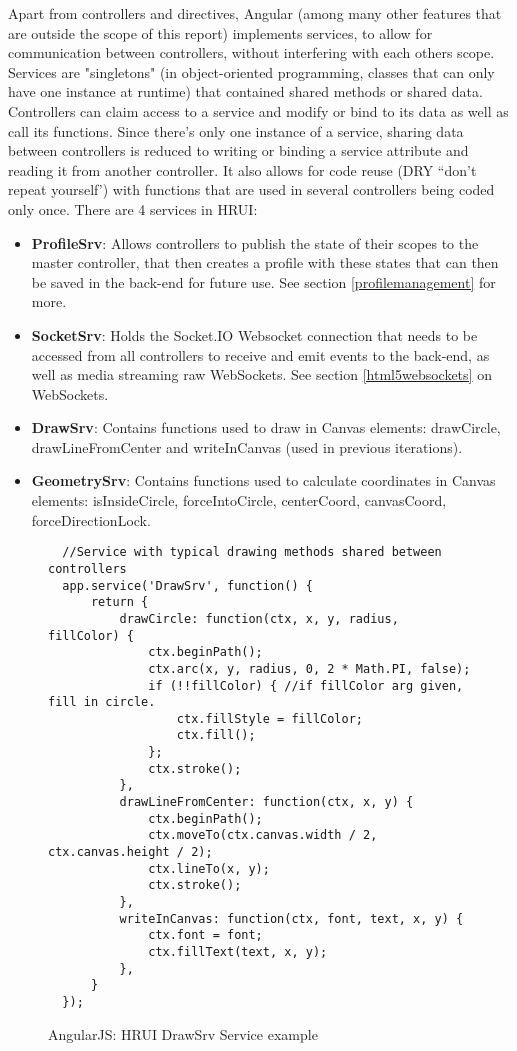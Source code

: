 Apart from controllers and directives, Angular (among many other features that are outside the scope of this report) implements services, to allow for communication between controllers, without interfering with each others scope. Services are "singletons" (in object-oriented programming, classes that can only have one instance at runtime) that contained shared methods or shared data. Controllers can claim access to a service and modify or bind to its data as well as call its functions. Since there's only one instance of a service, sharing data between controllers is reduced to writing or binding a service attribute and reading it from another controller. It also allows for code reuse (DRY ``don't repeat yourself') with functions that are used in several controllers being coded only once. There are 4 services in HRUI:
\begin{itemize}
  \item \textbf{ProfileSrv}: Allows controllers to publish the state of their scopes to the master controller, that then creates a profile with these states that can then be saved in the back-end for future use. See section \ref{profilemanagement} for more.
  \item \textbf{SocketSrv}: Holds the Socket.IO Websocket connection that needs to be accessed from all controllers to receive and emit events to the back-end, as well as media streaming raw WebSockets. See section \ref{html5websockets} on WebSockets.
  \item \textbf{DrawSrv}: Contains functions used to draw in Canvas elements: drawCircle, drawLineFromCenter and writeInCanvas (used in previous iterations).
  \item \textbf{GeometrySrv}: Contains functions used to calculate coordinates in Canvas elements: isInsideCircle, forceIntoCircle, centerCoord, canvasCoord, forceDirectionLock.
\end{itemize}
  \begin{figure}[H]
  \centering
  \captionsetup{justification=centering}
  \begin{verbatim}
  //Service with typical drawing methods shared between controllers
  app.service('DrawSrv', function() {
      return {
          drawCircle: function(ctx, x, y, radius, fillColor) {
              ctx.beginPath();
              ctx.arc(x, y, radius, 0, 2 * Math.PI, false);
              if (!!fillColor) { //if fillColor arg given, fill in circle.
                  ctx.fillStyle = fillColor;
                  ctx.fill();
              };
              ctx.stroke();
          },
          drawLineFromCenter: function(ctx, x, y) {
              ctx.beginPath();
              ctx.moveTo(ctx.canvas.width / 2, ctx.canvas.height / 2);
              ctx.lineTo(x, y);
              ctx.stroke();
          },
          writeInCanvas: function(ctx, font, text, x, y) {
              ctx.font = font;
              ctx.fillText(text, x, y);
          },
      }
  });
  \end{verbatim}
  \caption{AngularJS: HRUI DrawSrv Service example}
  \end{figure}
